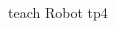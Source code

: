 \documentclass[a4paper,12pt]{article}
\begin{document}
\begin{figure}[H]
    \centering
    \begin{adjustbox}{scale = 0.85, max width=\columnwidth}
    \end{adjustbox}
    \caption{teach Robot tp4}
\end{figure}

\subsection{}



\end{document}
